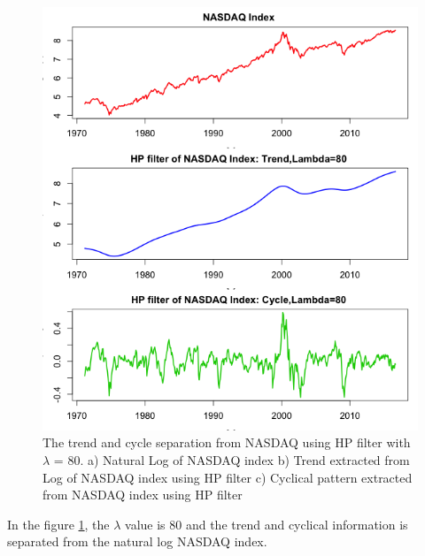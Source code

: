 \begin{figure}[!ht]
\centering
\includegraphics[scale=.65]{Images/NASDAQHP80}
\centering
\caption{The trend and cycle separation from NASDAQ using HP filter with $\lambda$ = 80. a) Natural Log of NASDAQ index b) Trend extracted from Log of NASDAQ index using HP filter c) Cyclical pattern extracted from NASDAQ index using HP filter }
\label{fig:NASDAQHP80}
\end{figure}
In the figure \ref{fig:NASDAQHP80}, the $\lambda$ value is 80 and the trend and cyclical information is separated from the natural log NASDAQ index.


